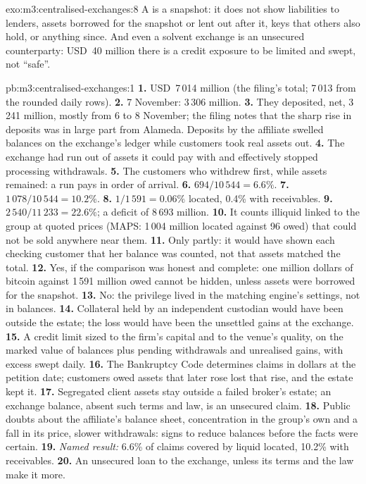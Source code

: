 \begin{solution}{exo:m3:centralised-exchanges:8}
A  is a snapshot: it does not show liabilities to lenders, assets borrowed for the snapshot
or lent out after it, keys that others also hold, or anything since. And even a solvent exchange is an
unsecured counterparty: USD~40 million there is a credit exposure to be limited and swept, not ``safe''.
\end{solution}

\begin{solution}{pb:m3:centralised-exchanges:1}
\textbf{1.} USD~7\,014 million (the filing's total; 7\,013 from the rounded daily rows). \textbf{2.} 7
November: 3\,306 million. \textbf{3.} They deposited, net, 3\,241 million, mostly from 6 to 8 November;
the filing notes that the sharp rise in deposits was in large part from Alameda. Deposits by the affiliate
swelled balances on the exchange's ledger while customers took real assets out. \textbf{4.} The exchange
had run out of assets it could pay with and effectively stopped processing withdrawals. \textbf{5.} The
customers who withdrew first, while assets remained: a run pays in order of arrival. \textbf{6.} $694/10\,544
= 6.6\%$. \textbf{7.} $1\,078/10\,544 = 10.2\%$. \textbf{8.} $1/1\,591 = 0.06\%$ located, 0.4\% with
receivables. \textbf{9.} $2\,540/11\,233 = 22.6\%$; a deficit of 8\,693 million. \textbf{10.} It counts
illiquid  linked to the group at quoted prices (MAPS: 1\,004 million located against 96 owed) that
could not be sold anywhere near them. \textbf{11.} Only partly: it would have shown each checking customer
that her balance was counted, not that assets matched the total. \textbf{12.} Yes, if the comparison was
honest and complete: one million dollars of bitcoin against 1\,591 million owed cannot be hidden, unless
assets were borrowed for the snapshot. \textbf{13.} No: the privilege lived in the matching engine's
settings, not in balances. \textbf{14.} Collateral held by an independent custodian would have been outside
the estate; the loss would have been the unsettled gains at the exchange. \textbf{15.} A credit limit sized
to the firm's capital and to the venue's quality, on the marked value of balances plus pending withdrawals
and unrealised gains, with excess swept daily. \textbf{16.} The Bankruptcy Code determines claims in dollars
at the petition date; customers owed assets that later rose lost that rise, and the estate kept it.
\textbf{17.} Segregated client assets stay outside a failed broker's estate; an exchange balance, absent
such terms and law, is an unsecured claim. \textbf{18.} Public doubts about the affiliate's balance sheet,
concentration in the group's own  and a fall in its price, slower withdrawals: signs to reduce balances
before the facts were certain. \textbf{19.} \emph{Named result:} 6.6\% of  claims covered by
liquid  located, 10.2\% with receivables. \textbf{20.} An unsecured loan to the exchange, unless its
terms and the law make it more.
\end{solution}

